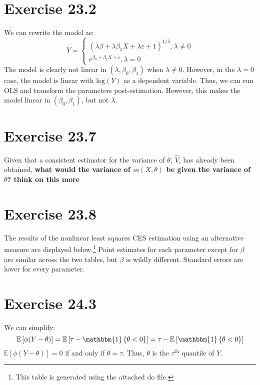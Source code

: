 \documentclass{article}
\newcommand{\loge}[1]{\text{log}\left(#1\right)}
\newcommand{\one}[1]{\mathbbm{1}\left\{#1\right\}}
\newcommand{\eps}{\varepsilon}
\newcommand{\E}[1]{\mathbb{E}\left[#1\right]}%
\begin{document}

\section*{Exercise 23.2}

We can rewrite the model as:
\[
	Y = 	\begin{cases}
				\left(\lambda\beta + \lambda\beta_1 X + \lambda\eps  + 1\right)^{1/\lambda},	\lambda\neq 0	\\
				e^{\beta_0 + \beta_1X + \eps},												 	\lambda = 0
			\end{cases}
\]
The model is clearly not linear in $(\lambda,\beta_0,\beta_1)$ when $\lambda\neq0$. However, in the ${\lambda=0}$ case, the model is linear with $\loge{Y}$ as a dependent variable. Thus, we can run OLS and transform the parameters post-estimation. However, this makes the model linear in $(\beta_0,\beta_1)$, but not $\lambda$.


\section*{Exercise 23.7}
Given that a consistent estimator for the variance of $\theta$, $\hat{V}$, has already been obtained, \textbf{what would the variance of $m(X,\theta)$ be given the variance of $\theta$? think on this more}




\section*{Exercise 23.8}
The results of the nonlinear least squares CES estimation using an alternative measure are displayed below.\footnote{This table is generated using the attached do file.} Point estimates for each parameter except for $\beta$ are similar across the two tables, but $\beta$ is wildly different. Standard errors are lower for every parameter. 
\begin{center}
	
\end{center}



\section*{Exercise 24.3}
We can simplify:
\[
	\E{\phi(Y-\theta)} = \E{\tau - \one{\theta<0}} = \tau - \E{\one{\theta<0}}
\]
$\E{\phi(Y-\theta)}=0$ if and only if $\theta=\tau$. Thus, $\theta$ is the $\tau^{\text{th}}$ quantile of $Y$.
\end{document}
